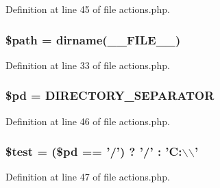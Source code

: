 \-Definition at line 45 of file actions.\-php.

\hypertarget{actions_8php_a0a4baf0b22973c07685c3981f0d17fc4}{
\subsubsection[{\$path}]{\setlength{\rightskip}{0pt plus 5cm}\$path = dirname(\-\_\-\-\_\-\-F\-I\-L\-E\-\_\-\-\_\-)}}\label{actions_8php_a0a4baf0b22973c07685c3981f0d17fc4}


\-Definition at line 33 of file actions.\-php.

\hypertarget{actions_8php_a0504ca5eae7aa6afd25cce9724b68ec6}{
\subsubsection[{\$pd}]{\setlength{\rightskip}{0pt plus 5cm}\$pd = \-D\-I\-R\-E\-C\-T\-O\-R\-Y\-\_\-\-S\-E\-P\-A\-R\-A\-T\-O\-R}}\label{actions_8php_a0504ca5eae7aa6afd25cce9724b68ec6}


\-Definition at line 46 of file actions.\-php.

\hypertarget{actions_8php_a31daebf88fc668f410293e2c70cea3fc}{
\subsubsection[{\$test}]{\setlength{\rightskip}{0pt plus 5cm}\${\bf test} = (\$pd == '/') ? '/' \-: '\-C\-:$\backslash$$\backslash$'}}\label{actions_8php_a31daebf88fc668f410293e2c70cea3fc}


\-Definition at line 47 of file actions.\-php.

